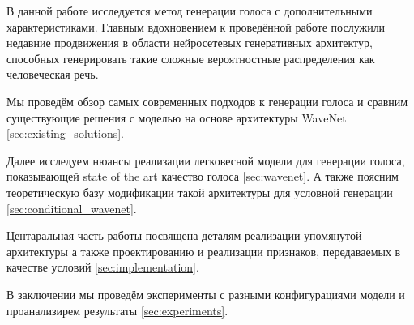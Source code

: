 
% 
        
    \label{sections/introduction}
    
    В данной работе исследуется метод генерации голоса с дополнительными характеристиками.
    Главным вдохновением к проведённой работе послужили недавние продвижения в области нейросетевых  генеративных архитектур, способных генерировать такие сложные вероятностные распределения как человеческая речь\cite{article:van2016wavenet}.
    
    Мы проведём обзор самых современных подходов к генерации голоса и сравним существующие решения с моделью на основе архитектуры WaveNet \ref{sec:existing_solutions}.
    
    Далее исследуем нюансы реализации легковесной модели для генерации голоса, показывающей state of the art качество голоса \ref{sec:wavenet}. А также поясним теоретическую базу модификации такой архитектуры для условной генерации \ref{sec:conditional_wavenet}. 
    
    Центаральная часть работы посвящена деталям реализации упомянутой архитектуры а также проектированию и реализации признаков, передаваемых в качестве условий \ref{sec:implementation}.
    
    В заключении мы проведём эксперименты с разными конфигурациями модели и проанализирем результаты \ref{sec:experiments}.

% 

